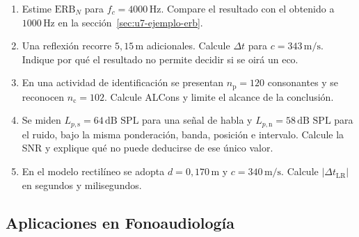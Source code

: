 \begin{enumerate}[label=\textbf{N\arabic*.},leftmargin=*]
    \item Estime \(\mathrm{ERB}_{N}\) para
    \(f_c=4000\,\text{Hz}\). Compare el resultado con el obtenido a
    \(1000\,\text{Hz}\) en la sección~\ref{sec:u7-ejemplo-erb}.

    \item Una reflexión recorre \(5{,}15\,\text{m}\) adicionales. Calcule
    \(\Delta t\) para \(c=343\,\text{m}/\text{s}\). Indique por qué el
    resultado no permite decidir si se oirá un eco.

    \item En una actividad de identificación se presentan
    \(n_\mathrm{p}=120\) consonantes y se reconocen
    \(n_\mathrm{c}=102\). Calcule ALCons y limite el alcance de la conclusión.

    \item Se miden \(L_{p,\mathrm{s}}=64\,\text{dB SPL}\) para una señal de
    habla y \(L_{p,\mathrm{n}}=58\,\text{dB SPL}\) para el ruido, bajo la misma
    ponderación, banda, posición e intervalo. Calcule la SNR y explique qué no
    puede deducirse de ese único valor.

    \item En el modelo rectilíneo se adopta
    \(d=0{,}170\,\text{m}\) y \(c=340\,\text{m}/\text{s}\). Calcule
    \(\lvert\Delta t_\mathrm{LR}\rvert\) en segundos y milisegundos.
\end{enumerate}

\subsection*{Aplicaciones en Fonoaudiología}

